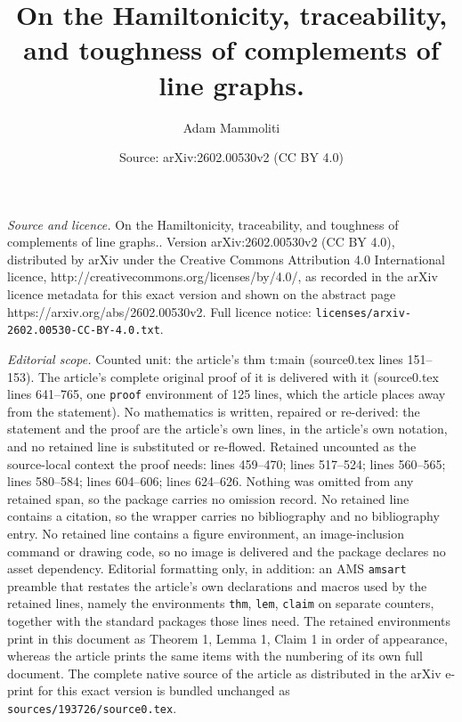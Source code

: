 \documentclass[10pt,a4paper]{amsart}
\title{On the Hamiltonicity, traceability, and toughness of complements of line graphs.}
\author{Adam Mammoliti}
\date{Source: arXiv:2602.00530v2 (CC BY 4.0)}
\begin{document}
\maketitle

\noindent\emph{Source and licence.} On the Hamiltonicity, traceability, and toughness of complements of line graphs.. Version arXiv:2602.00530v2 (CC BY 4.0), distributed by arXiv under the Creative Commons Attribution 4.0 International licence, http://creativecommons.org/licenses/by/4.0/, as recorded in the arXiv licence metadata for this exact version and shown on the abstract page https://arxiv.org/abs/2602.00530v2. Full licence notice: \texttt{licenses/arxiv-2602.00530-CC-BY-4.0.txt}.\par\smallskip

\noindent\textit{Editorial scope.} Counted unit: the article's thm t:main (source0.tex lines 151--153). The article's complete original proof of it is delivered with it (source0.tex lines 641--765, one \texttt{proof} environment of 125 lines, which the article places away from the statement). No mathematics is written, repaired or re-derived: the statement and the proof are the article's own lines, in the article's own notation, and no retained line is substituted or re-flowed.  Retained uncounted as the source-local context the proof needs: lines 459--470; lines 517--524; lines 560--565; lines 580--584; lines 604--606; lines 624--626.  Nothing was omitted from any retained span, so the package carries no omission record.  No retained line contains a citation, so the wrapper carries no bibliography and no bibliography entry.  No retained line contains a figure environment, an image-inclusion command or drawing code, so no image is delivered and the package declares no asset dependency.  Editorial formatting only, in addition: an AMS \texttt{amsart} preamble that restates the article's own declarations and macros used by the retained lines, namely the environments \texttt{thm}, \texttt{lem}, \texttt{claim} on separate counters, together with the standard packages those lines need.  The retained environments print in this document as Theorem 1, Lemma 1, Claim 1 in order of appearance, whereas the article prints the same items with the numbering of its own full document.  The complete native source of the article as distributed in the arXiv e-print for this exact version is bundled unchanged as \texttt{sources/193726/source0.tex}.
\end{document}
